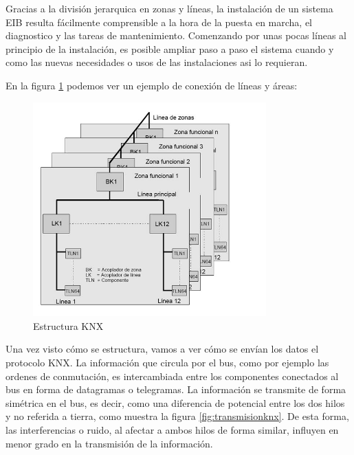 Gracias a la división jerarquica en zonas y líneas, la instalación de un sistema EIB resulta f\'acilmente comprensible a la hora de la puesta en marcha, el diagnostico y las tareas de mantenimiento. Comenzando por unas pocas líneas al principio de la instalación, es posible ampliar paso a paso el sistema cuando y como las nuevas necesidades o usos de las instalaciones asi lo requieran.


En la figura \ref{fig:estructuraknx} podemos ver un ejemplo de conexión de líneas y \'areas:

\begin{figure}[ht]
	\centering
		\includegraphics[width=0.8\textwidth]{imagenes/Acopladores-Knx.jpg}
	\caption{Estructura KNX}
	\label{fig:estructuraknx}
\end{figure}


Una vez visto cómo se estructura, vamos a ver cómo se envían los datos el protocolo KNX. La información que circula por el bus, como por ejemplo las ordenes de conmutación, es intercambiada entre los componentes conectados al bus en forma de datagramas o telegramas. La información se transmite de forma simétrica en el bus, es decir, como una diferencia de potencial entre los dos hilos y no referida a tierra, como muestra la figura \ref{fig:transmisionknx}. De esta forma, las interferencias o ruido, al afectar a ambos hilos de forma similar, influyen en menor grado en la transmisión de la información. 


